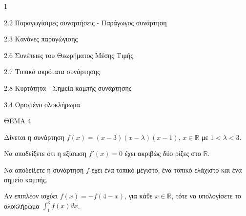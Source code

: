 \begin{ylh}{1}
    \item 2.2 Παραγωγίσιμες συναρτήσεις - Παράγωγος συνάρτηση
    \item 2.3 Κανόνες παραγώγισης
    \item 2.6 Συνέπειες του Θεωρήματος Μέσης Τιμής
    \item 2.7 Τοπικά ακρότατα συνάρτησης
    \item 2.8 Κυρτότητα - Σημεία καμπής συνάρτησης
    \item 3.4 Ορισμένο ολοκλήρωμα
\end{ylh}
ΘΕΜΑ 4

Δίνεται η συνάρτηση $f(x)=(x-3)(x-\lambda)(x-1)$, $x\in\mathbb{R}$ με $1<\lambda<3$.
\begin{alist}
\item Να αποδείξετε ότι η εξίσωση $f'(x)=0$ έχει ακριβώς δύο ρίζες στο $\mathbb{R}$.  
\item Να αποδείξετε η συνάρτηση $f$ έχει ένα τοπικό μέγιστο, ένα τοπικό ελάχιστο και ένα σημείο καμπής.  
\item Αν επιπλέον ισχύει $f(x)=-f(4-x)$, για κάθε $x\in\mathbb{R}$, τότε να υπολογίσετε το ολοκλήρωμα $\int_1^3 f(x)dx$.  
\end{alist}
